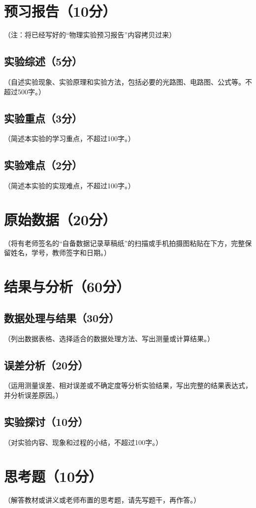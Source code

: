 \documentclass{Phyport}
\begin{document}
\setcounter{page}{0}
\makecover

\section{预习报告（10分）}
（注：将已经写好的“物理实验预习报告”内容拷贝过来）

\subsection{实验综述（5分）}
（自述实验现象、实验原理和实验方法，包括必要的光路图、电路图、公式等。不超过500字。）

\subsection{实验重点（3分）}
（简述本实验的学习重点，不超过100字。）

\subsection{实验难点（2分）}
（简述本实验的实现难点，不超过100字。）

\section{原始数据（20分）}
（将有老师签名的“自备数据记录草稿纸”的扫描或手机拍摄图粘贴在下方，完整保留姓名，学号，教师签字和日期。）

\section{结果与分析（60分）}
\subsection{数据处理与结果（30分）}
（列出数据表格、选择适合的数据处理方法、写出测量或计算结果。）

\subsection{误差分析（20分）}
（运用测量误差、相对误差或不确定度等分析实验结果，写出完整的结果表达式，并分析误差原因。）

\subsection{实验探讨（10分）}
（对实验内容、现象和过程的小结，不超过100字。）

\section{思考题（10分）}
（解答教材或讲义或老师布置的思考题，请先写题干，再作答。）


\end{document}
